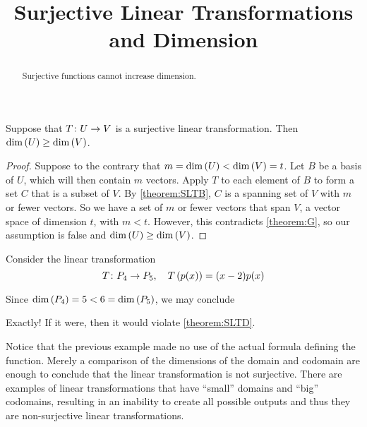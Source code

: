 \documentclass{ximera}
\title{Surjective Linear Transformations and Dimension}
\begin{document}
\begin{abstract}
  Surjective functions cannot increase dimension.
\end{abstract}
\maketitle

\begin{theorem}
\label{theorem:SLTD}

Suppose that $T\colon U\rightarrow V$ is a surjective linear transformation.  Then $\dim\left(U\right)\geq\dim\left(V\right)$.


\begin{proof}
Suppose to the contrary that
$m=\dim\left(U\right)<\dim\left(V\right)=t$.
Let $B$ be  a basis of $U$, which will then contain $m$ vectors.  Apply $T$ to each element of $B$ to form a set $C$ that is a subset of $V$.  By \ref{theorem:SLTB}, $C$ is a spanning set of $V$ with $m$ or fewer vectors.  So we have a set of $m$ or fewer vectors that span $V$, a vector space of dimension $t$, with
$m<t$.
However, this contradicts \ref{theorem:G}, so our assumption is false and $\dim\left(U\right)\geq\dim\left(V\right)$.



\end{proof}
\end{theorem}

\begin{example}

Consider the linear transformation 
\[T\colon P_4\rightarrow P_5,\quad
T\left(p(x)\right)=(x-2)p(x)
\]

Since
$\dim\left(P_4\right)=5<6=\dim\left(P_5\right)$, we may conclude
\begin{multipleChoice}
\end{multipleChoice}
\begin{feedback}[correct]
Exactly!  If it were, then it would violate \ref{theorem:SLTD}.
\end{feedback}

\end{example}

Notice that the previous example made no use of the actual formula defining the function.  Merely a comparison of the dimensions of the domain and codomain are enough to conclude that the linear transformation is not surjective.  There are examples of linear transformations that have ``small'' domains and ``big'' codomains, resulting in an inability to create all possible outputs and thus they are non-surjective linear transformations.
\end{document}
